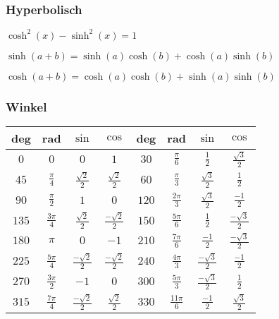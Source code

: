 \subsubsection{Hyperbolisch}
\begin{compactitem}
    \item $\cosh^2(x) - \sinh^2(x) = 1$
    \item $\sinh(a + b) = \sinh(a)\cosh(b) + \cosh(a)\sinh(b)$
    \item $\cosh(a + b) = \cosh(a)\cosh(b) + \sinh(a)\sinh(b)$
\end{compactitem}

\subsubsection{Winkel}
\begin{tabular}{c c c c || c c c c}
    deg   & rad                & $\sin$                 & $\cos$                  & deg & rad & $\sin$ & $\cos$\\\hline
    $0$   & $0$                & $0$                    & $1$                     &
    $30$  & $\frac{\pi}{6}$    & $\frac{1}{2}$          & $\frac{\sqrt{3}}{2}$\\
    $45$  & $\frac{\pi}{4}$    & $\frac{\sqrt{2}}{2}$   & $\frac{\sqrt{2}}{2}$    &
    $60$  & $\frac{\pi}{3}$    & $\frac{\sqrt{3}}{2}$   & $\frac{1}{2}$\\
    $90$  & $\frac{\pi}{2}$    & $1$                    & $0$                     &
    $120$ & $\frac{2\pi}{3}$   & $\frac{\sqrt{3}}{2} $  & $\frac{-1}{2}$\\
    $135$ & $\frac{3 \pi}{4}$  & $\frac{\sqrt{2}}{2}$   & $\frac{-\sqrt{2}}{2}$   &
    $150$ & $\frac{5 \pi}{6}$  & $\frac{1}{2}$          & $\frac{-\sqrt{3}}{2}$\\
    $180$ & $\pi$              & $0$                    & $-1$                    &
    $210$ & $\frac{7\pi}{6}$   & $\frac{-1}{2}$         & $\frac{-\sqrt{3}}{2}$\\
    $225$ & $\frac{5\pi}{4}$   & $\frac{-\sqrt{2}}{2}$  & $\frac{-\sqrt{2}}{2}$   &
    $240$ & $\frac{4\pi}{3}$   & $\frac{-\sqrt{3}}{2}$  & $\frac{-1}{2}$\\
    $270$ & $\frac{3 \pi}{2}$  & $-1$                   & $0$                     &
    $300$ & $\frac{5 \pi}{3}$  & $\frac{-\sqrt{3}}{2} $ & $\frac{1}{2}$\\
    $315$ & $\frac{7 \pi}{4}$  & $\frac{-\sqrt{2}}{2} $ & $\frac{\sqrt{2}}{2}$    &
    $330$ & $\frac{11 \pi}{6}$ & $\frac{-1}{2} $        & $\frac{\sqrt{3}}{2}$\\
\end{tabular}

